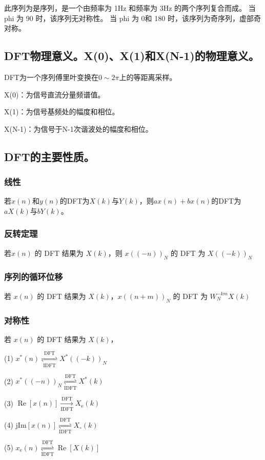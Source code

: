 \documentclass{../source/Experiment}
\begin{document}
此序列为是序列，是一个由频率为 1Hz 和频率为 3Hz 的两个序列复合而成。
当 phi 为 90 时，该序列无对称性。
当 phi 为 0和 180 时，该序列为奇序列，虚部奇对称。
\subsection{DFT物理意义。X(0)、X(1)和X(N-1)的物理意义。}

DFT为一个序列傅里叶变换在$0 \sim 2\pi$上的等距离采样。

X(0)：为信号直流分量频谱值。

X(1)：为信号基频处的幅度和相位。

X(N-1)：为信号于N-1次谐波处的幅度和相位。

\subsection{DFT的主要性质。}
\subsubsection{线性}
若$x(n)$和$y(n)$的DFT为$X(k)$与$Y(k)$，则$ax(n)+bx(n)$的DFT为$aX(k)$与$bY(k)$。
\subsubsection{反转定理}
若$x(n)$ 的 DFT 结果为 $X(k)$，则 $x((-n))_N$ 的 DFT 为 $X((-k))_N$
\subsubsection{序列的循环位移}

若 $x(n)$ 的 DFT 结果为 $X(k)$，$x((n + m))_N$ 的 DFT 为 $W_{N}^{-k m} X(k)$
\subsubsection{对称性}
若 $x(n)$ 的 DFT 结果为 $X(k)$，

(1) $x^{*}(n) \underset{\text { IDFT }}{\stackrel{\text { DFT }}{\rightleftharpoons}} X^{*}((-k))_{N}$

(2) $x^{*}((-n))_{N} \underset{\mathrm{IDFT}}{\stackrel{\mathrm{DFT}}{\rightleftharpoons}} X^{*}(k)$

(3) $\operatorname{Re}[x(n)] \underset{\mathrm{IDFT}}{\stackrel{\mathrm{DFT}}{\longrightarrow}} X_{\mathrm{e}}(k)$

(4) $\mathrm{jIm}[x(n)] \underset{\mathrm{IDFT}}{\stackrel{\mathrm{DFT}}{\rightleftharpoons}} X_{\circ}(k)$

(5) $x_{\mathrm{e}}(n) \underset{\mathrm{IDFT}}{\stackrel{\mathrm{DFT}}{\rightleftharpoons}} \operatorname{Re}[X(k)]$
\end{document}
